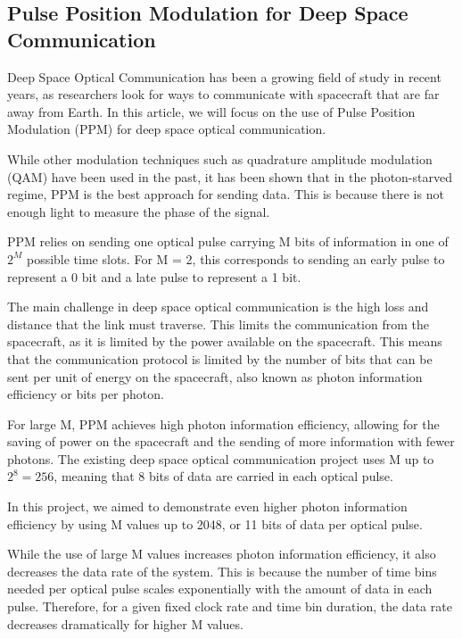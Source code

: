 \documentclass[11pt]{caltech_thesis} %
\begin{document}
\hypertarget{pulse-position-modulation-for-deep-space-communication}{%
\subsection{Pulse Position Modulation for Deep Space
Communication}\label{pulse-position-modulation-for-deep-space-communication}}

Deep Space Optical Communication has been a growing field of study in
recent years, as researchers look for ways to communicate with
spacecraft that are far away from Earth. In this article, we will focus
on the use of Pulse Position Modulation (PPM) for deep space optical
communication.

While other modulation techniques such as quadrature amplitude
modulation (QAM) have been used in the past, it has been shown that in
the photon-starved regime, PPM is the best approach for sending data.
This is because there is not enough light to measure the phase of the
signal.

PPM relies on sending one optical pulse carrying M bits of information
in one of \(2^M\) possible time slots. For M = 2, this corresponds to
sending an early pulse to represent a 0 bit and a late pulse to
represent a 1 bit.

The main challenge in deep space optical communication is the high loss
and distance that the link must traverse. This limits the communication
from the spacecraft, as it is limited by the power available on the
spacecraft. This means that the communication protocol is limited by the
number of bits that can be sent per unit of energy on the spacecraft,
also known as photon information efficiency or bits per photon.

For large M, PPM achieves high photon information efficiency, allowing
for the saving of power on the spacecraft and the sending of more
information with fewer photons. The existing deep space optical
communication project uses M up to \(2^8 = 256\), meaning that 8 bits of
data are carried in each optical pulse.

In this project, we aimed to demonstrate even higher photon information
efficiency by using M values up to 2048, or 11 bits of data per optical
pulse.

While the use of large M values increases photon information efficiency,
it also decreases the data rate of the system. This is because the
number of time bins needed per optical pulse scales exponentially with
the amount of data in each pulse. Therefore, for a given fixed clock
rate and time bin duration, the data rate decreases dramatically for
higher M values.
\end{document}
